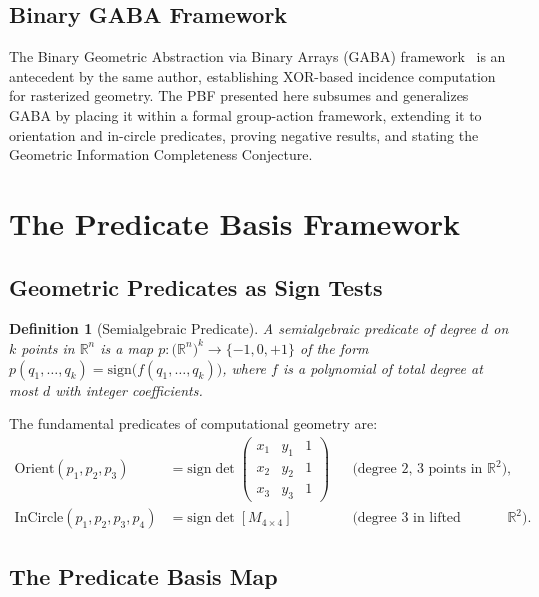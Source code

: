 \documentclass[11pt,letterpaper]{article}
\newtheorem{definition}[theorem]{Definition}
\newcommand{\RR}{\mathbb{R}}
\newcommand{\sign}{\mathrm{sign}}
\newcommand{\Orient}{\mathrm{Orient}}
\newcommand{\InCircle}{\mathrm{InCircle}}
\begin{document}
\subsection{Binary GABA Framework}

The Binary Geometric Abstraction via Binary Arrays (GABA) framework~\cite{Dang25} is an
antecedent by the same author, establishing XOR-based incidence computation for
rasterized geometry.  The PBF presented here subsumes and generalizes GABA by placing
it within a formal group-action framework, extending it to orientation and in-circle
predicates, proving negative results, and stating the Geometric Information Completeness
Conjecture.

\section{The Predicate Basis Framework}\label{sec:framework}

\subsection{Geometric Predicates as Sign Tests}

\begin{definition}[Semialgebraic Predicate]\label{def:sapred}
A \emph{semialgebraic predicate of degree $d$ on $k$ points in $\RR^n$} is a map
$p:\bigl(\RR^n\bigr)^k\to\{-1,0,+1\}$ of the form
$p(q_1,\dots,q_k)=\sign\bigl(f(q_1,\dots,q_k)\bigr)$,
where $f$ is a polynomial of total degree at most $d$ with integer coefficients.
\end{definition}

The fundamental predicates of computational geometry are:
\begin{align*}
\Orient(p_1,p_2,p_3) &= \sign\!\det\!\begin{pmatrix}x_1&y_1&1\\x_2&y_2&1\\x_3&y_3&1\end{pmatrix}
  &&\text{(degree 2, 3 points in }\RR^2),\\
\InCircle(p_1,p_2,p_3,p_4) &= \sign\det[M_{4\times4}]
  &&\text{(degree 3 in lifted coords, 4 points in }\RR^2).
\end{align*}

\subsection{The Predicate Basis Map}
\end{document}
